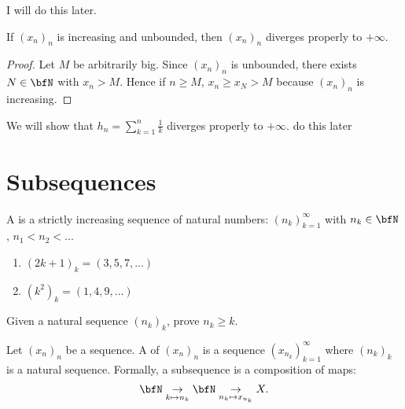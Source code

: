     \begin{example}
        {\color{red} I will do this later.}
    \end{example}

    \begin{proposition}
        If $(x_n)_n$ is increasing and unbounded, then $(x_n)_n$ diverges properly to $+\infty$. 
    \end{proposition}
        \begin{proof}
            Let $M$ be arbitrarily big. Since $(x_n)_n$ is unbounded, there exists $N \in \bfN$ with $x_n > M$. Hence if $n\geq M$, $x_n \geq x_N > M$ because $(x_n)_n$ is increasing.
        \end{proof}

    \begin{example}
        We will show that $h_n = \sum_{k=1}^n \frac{1}{k}$ diverges properly to $+\infty$. {\color{red} do this later}
    \end{example}

\section{Subsequences}
    \begin{definition}
        A  is a strictly increasing sequence of natural numbers: $(n_k)_{k=1}^\infty$ with $n_k \in \bfN$, $n_1 < n_2 < ...$
    \end{definition}

    \begin{example}
        \phantom{a}
        \begin{enumerate}[label = (\arabic*)]
            \item $(2k+1)_k = (3,5,7,...)$ 
            \item $(k^2)_k = (1,4,9,...)$
        \end{enumerate}
    \end{example}

    \begin{exercise}
        Given a natural sequence $(n_k)_k$, prove $n_k \geq k$.
    \end{exercise}

    \begin{definition}
        Let $(x_n)_n$ be a sequence. A  of $(x_n)_n$ is a sequence $(x_{n_k})_{k=1}^\infty$ where $(n_k)_k$ is a natural sequence. Formally, a subsequence is a composition of maps:
            \begin{equation*}
            \begin{split}
                \bfN \underset{k \mapsto n_k}{\rightarrow} \bfN \underset{n_k \mapsto x_{n_k}}{\rightarrow} X.
            \end{split}
            \end{equation*}
    \end{definition}

